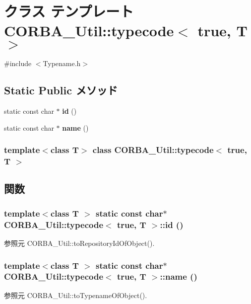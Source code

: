 \section{クラス テンプレート CORBA\_\-Util::typecode$<$ true, T $>$}
\label{classCORBA__Util_1_1typecode_3_01true_00_01T_01_4}


{\ttfamily \#include $<$Typename.h$>$}

\subsection*{Static Public メソッド}
\begin{DoxyCompactItemize}
\item 
static const char $\ast$ {\bf id} ()
\item 
static const char $\ast$ {\bf name} ()
\end{DoxyCompactItemize}
\subsubsection*{template$<$class T$>$ class CORBA\_\-Util::typecode$<$ true, T $>$}



\subsection{関数}
\subsubsection[{id}]{\setlength{\rightskip}{0pt plus 5cm}template$<$class T $>$ static const char$\ast$ CORBA\_\-Util::typecode$<$ true, T $>$::id ()\hspace{0.3cm}{\ttfamily  [inline, static]}}\label{classCORBA__Util_1_1typecode_3_01true_00_01T_01_4_a5205cf4c0919b1dd43fe1b6ce31a4e38}


参照元 CORBA\_\-Util::toRepositoryIdOfObject().

\subsubsection[{name}]{\setlength{\rightskip}{0pt plus 5cm}template$<$class T $>$ static const char$\ast$ CORBA\_\-Util::typecode$<$ true, T $>$::name ()\hspace{0.3cm}{\ttfamily  [inline, static]}}\label{classCORBA__Util_1_1typecode_3_01true_00_01T_01_4_a4b706bf265256aa4327c6a7ee6efba0e}


参照元 CORBA\_\-Util::toTypenameOfObject().

